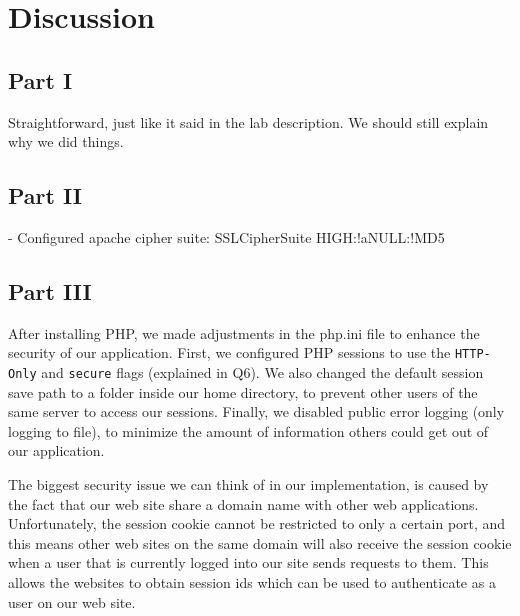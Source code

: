 \section{Discussion}

\subsection{Part I}

Straightforward, just like it said in the lab description.
We should still explain why we did things.

\subsection{Part II}

- Configured apache cipher suite: SSLCipherSuite HIGH:!aNULL:!MD5

\subsection{Part III}

After installing PHP, we made adjustments in the php.ini file to enhance the security of our application.
First, we configured PHP sessions to use the \verb/HTTP-Only/ and \verb/secure/ flags (explained in Q6).
We also changed the default session save path to a folder inside our home directory, to prevent other users of the same server to access our sessions.
Finally, we disabled public error logging (only logging to file), to minimize the amount of information others could get out of our application.

The biggest security issue we can think of in our implementation, is caused by the fact that our web site share a domain name with other web applications.
Unfortunately, the session cookie cannot be restricted to only a certain port, and this means other web sites on the same domain will also receive the session cookie when a user that is currently logged into our site sends requests to them.
This allows the websites to obtain session ids which can be used to authenticate as a user on our web site.
